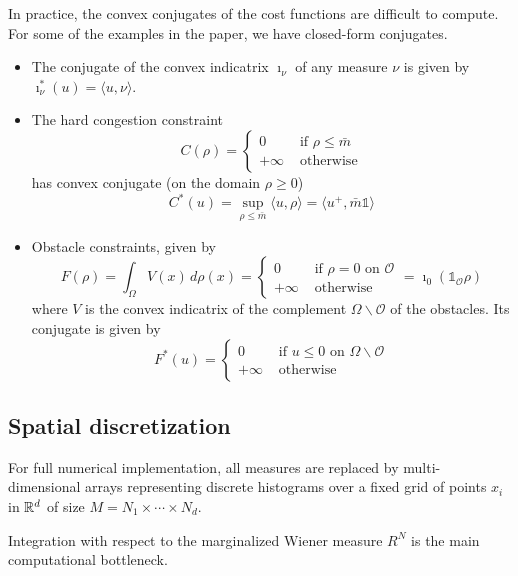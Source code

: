 \documentclass[../report.tex]{subfiles}
\begin{document}
\begin{remark}\label{rem:ConvexConj}
	In practice, the convex conjugates of the cost functions are difficult to compute. For some of the examples in the paper, we have closed-form conjugates.
	\begin{itemize}
		\item The conjugate of the convex indicatrix $\imath_{\nu}$ of any measure $\nu$ is given by $\imath_{\nu}^*(u) = \langle u, \nu\rangle$.
		\item The hard congestion constraint
		\[
		C(\rho) = \begin{cases}
		0&\text{ if }\rho\leq \bar{m} \\
		+\infty&\text{ otherwise}
		\end{cases}
		\]
		has convex conjugate (on the domain $\rho \geq 0$)
		\[
		C^*(u) = \sup_{\rho\leq \bar{m}}{} \langle u, \rho\rangle = \langle u^{+}, \bar{m}\mathds{1}\rangle
		\]
		\item Obstacle constraints, given by
		\[
		F(\rho) = \int_\Omega V(x)\,d\rho(x) =
		\begin{cases}
		0 & \text{ if } \rho = 0\text{ on }\mathscr{O} \\
		+\infty & \text{ otherwise}
		\end{cases}
		= \imath_{0}(\mathds{1}_{\mathscr{O}}\rho)
		\]
		where $V$ is the convex indicatrix of the complement $\Omega\backslash\mathscr{O}$ of the obstacles. Its conjugate is given by
		\[
		F^*(u) =
		\begin{cases}
		0& \text{ if } u \leq 0\text{ on } \Omega\backslash\mathscr{O} \\
		+\infty& \text{ otherwise}
		\end{cases}
		\]
	\end{itemize}
\end{remark}



\subsection{Spatial discretization}\label{sec:PartialDiscret}

For full numerical implementation, all measures are replaced by multi-dimensional arrays representing discrete histograms over a fixed grid of points $x_i$ in $\mathbb{R}^d$ of size $M = N_1\times\cdots\times N_d$.

Integration with respect to the marginalized Wiener measure $R^N$ is the main computational bottleneck. 
\end{document}

